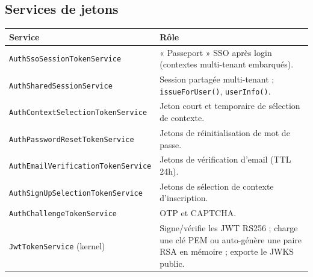 \documentclass[11pt,a4paper,oneside]{report}
\newcommand{\code}[1]{\texttt{\small #1}}
\begin{document}
\subsection{Services de jetons}
\begin{center}
\begin{tabular}{@{}p{6.2cm}p{7.6cm}@{}}
\toprule
\textbf{Service} & \textbf{Rôle}\\
\midrule
\code{AuthSsoSessionTokenService} & « Passeport » SSO après login (contextes multi-tenant embarqués).\\
\code{AuthSharedSessionService} & Session partagée multi-tenant ; \code{issueForUser()}, \code{userInfo()}.\\
\code{AuthContextSelectionToken\allowbreak Service} & Jeton court et temporaire de sélection de contexte.\\
\code{AuthPasswordResetToken\allowbreak Service} & Jetons de réinitialisation de mot de passe.\\
\code{AuthEmailVerificationToken\allowbreak Service} & Jetons de vérification d'email (TTL 24h).\\
\code{AuthSignUpSelectionToken\allowbreak Service} & Jetons de sélection de contexte d'inscription.\\
\code{AuthChallengeTokenService} & OTP et CAPTCHA.\\
\code{JwtTokenService} (kernel) & Signe/vérifie les JWT RS256 ; charge une clé PEM ou auto-génère une paire RSA en mémoire ; exporte le JWKS public.\\
\bottomrule
\end{tabular}
\end{center}
\end{document}
